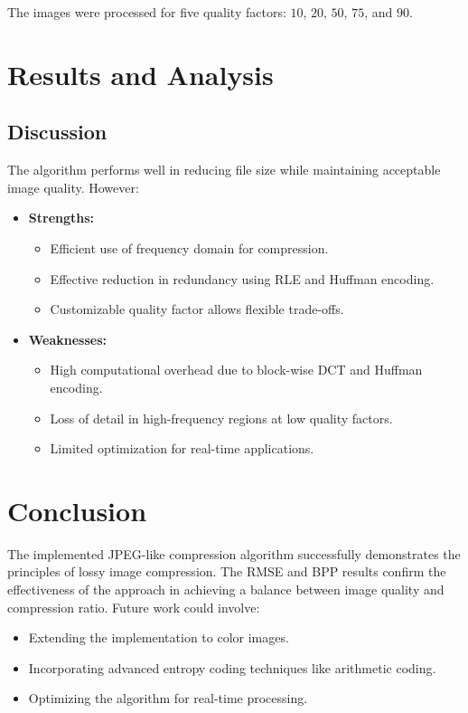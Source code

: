 \documentclass{article}
\begin{document}
The images were processed for five quality factors: $10$, $20$, $50$, $75$, and $90$.

\section{Results and Analysis}


\subsection{Discussion}
The algorithm performs well in reducing file size while maintaining acceptable image quality. However:
\begin{itemize}
    \item \textbf{Strengths:} 
    \begin{itemize}
        \item Efficient use of frequency domain for compression.
        \item Effective reduction in redundancy using RLE and Huffman encoding.
        \item Customizable quality factor allows flexible trade-offs.
    \end{itemize}
    \item \textbf{Weaknesses:}
    \begin{itemize}
        \item High computational overhead due to block-wise DCT and Huffman encoding.
        \item Loss of detail in high-frequency regions at low quality factors.
        \item Limited optimization for real-time applications.
    \end{itemize}
\end{itemize}

\section{Conclusion}
The implemented JPEG-like compression algorithm successfully demonstrates the principles of lossy image compression. The RMSE and BPP results confirm the effectiveness of the approach in achieving a balance between image quality and compression ratio. Future work could involve:
\begin{itemize}
    \item Extending the implementation to color images.
    \item Incorporating advanced entropy coding techniques like arithmetic coding.
    \item Optimizing the algorithm for real-time processing.
\end{itemize}
\end{document}
